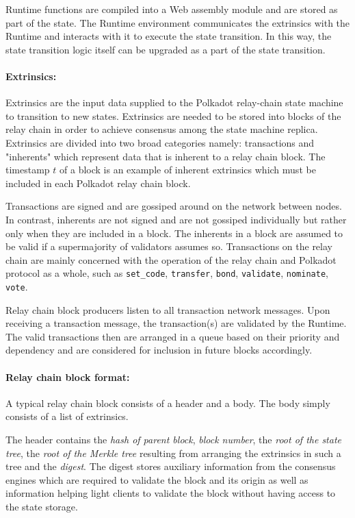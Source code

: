 Runtime functions are compiled into a Web assembly module and are stored as part of the state. The Runtime environment communicates the extrinsics with the Runtime and interacts with it to execute the state transition. In this way, the state transition logic itself can be upgraded as a part of the state transition.

\paragraph{Extrinsics:} \label{par:extrinsics}

Extrinsics are the input data supplied to the Polkadot relay-chain state machine to transition to new states. Extrinsics are needed to be stored into blocks of the relay chain in order to achieve consensus among the state machine replica. Extrinsics are divided into two broad categories namely: transactions and "inherents" which represent data that is inherent to a relay chain block. The timestamp $t$ of a block is an example of inherent extrinsics which must be included in each Polkadot relay chain block.

Transactions are signed and are gossiped around on the network between nodes. In contrast, inherents are not signed and are not gossiped individually but rather only when they are included in a block. The inherents in a block are assumed to be valid if a supermajority of validators assumes so.  
Transactions on the relay chain are mainly concerned with the operation of the relay chain and Polkadot protocol as a whole, such as \texttt{set\_code}, \texttt{transfer}, \texttt{bond}, \texttt{validate}, \texttt{nominate}, \texttt{vote}.

Relay chain block producers listen to all transaction network messages. Upon receiving a transaction message, the transaction(s) are validated by the Runtime. The valid transactions then are arranged in a queue based on their priority and dependency and are considered for inclusion in future blocks accordingly.

\paragraph{Relay chain block format:}
A typical relay chain block consists of a header and a body. The body simply consists of a list of extrinsics.

The header contains the \textit{hash of parent block}, \textit{block number}, the \textit{root of the state tree}, the \textit{root of the Merkle tree} resulting from arranging the extrinsics in such a tree and the \textit{digest}. The digest stores auxiliary information from the consensus engines which are required to validate the block and its origin as well as information helping light clients to validate the block without having access to the state storage.

